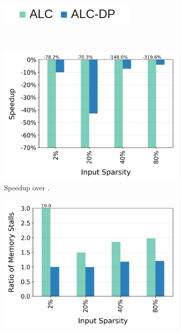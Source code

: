 \begin{figure}[t]
  \centering
  \begin{subfigure}{4cm}
    \centering
    \includegraphics[width=\textwidth]{Figures/Evaluations/Legend.png}
  \end{subfigure}\\
  \begin{subfigure}{.33\textwidth}
        \centering
    \includegraphics[width=\textwidth]{Figures/Evaluations/single_if_many_scatter_speedup.png}
    \caption{Speedup over \ifconv.}
    \label{fig:single-if-many-scatter}
  \end{subfigure}%
  \begin{subfigure}{.33\textwidth}
        \centering
    \includegraphics[width=\textwidth]{Figures/Evaluations/single_if_many_scatter_mem_stalls.png}

\end{subfigure}
\end{figure}
